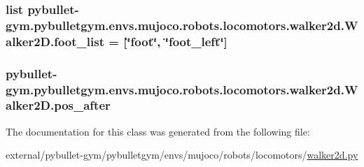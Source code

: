 \subsubsection[{\texorpdfstring{foot\+\_\+list}{foot_list}}]{\setlength{\rightskip}{0pt plus 5cm}list pybullet-\/gym.\+pybulletgym.\+envs.\+mujoco.\+robots.\+locomotors.\+walker2d.\+Walker2\+D.\+foot\+\_\+list = \mbox{[}\char`\"{}foot\char`\"{}, \char`\"{}foot\+\_\+left\char`\"{}\mbox{]}\hspace{0.3cm}{\ttfamily [static]}}\hypertarget{classpybullet-gym_1_1pybulletgym_1_1envs_1_1mujoco_1_1robots_1_1locomotors_1_1walker2d_1_1_walker2_d_a7c74b97fab83385f217b64cfb21de792}{}\label{classpybullet-gym_1_1pybulletgym_1_1envs_1_1mujoco_1_1robots_1_1locomotors_1_1walker2d_1_1_walker2_d_a7c74b97fab83385f217b64cfb21de792}
\subsubsection[{\texorpdfstring{pos\+\_\+after}{pos_after}}]{\setlength{\rightskip}{0pt plus 5cm}pybullet-\/gym.\+pybulletgym.\+envs.\+mujoco.\+robots.\+locomotors.\+walker2d.\+Walker2\+D.\+pos\+\_\+after}\hypertarget{classpybullet-gym_1_1pybulletgym_1_1envs_1_1mujoco_1_1robots_1_1locomotors_1_1walker2d_1_1_walker2_d_aca4b5d1d5804e3f573a5b9c9a7d9f268}{}\label{classpybullet-gym_1_1pybulletgym_1_1envs_1_1mujoco_1_1robots_1_1locomotors_1_1walker2d_1_1_walker2_d_aca4b5d1d5804e3f573a5b9c9a7d9f268}


The documentation for this class was generated from the following file\+:\begin{DoxyCompactItemize}
\item 
external/pybullet-\/gym/pybulletgym/envs/mujoco/robots/locomotors/\hyperlink{mujoco_2robots_2locomotors_2walker2d_8py}{walker2d.\+py}\end{DoxyCompactItemize}
